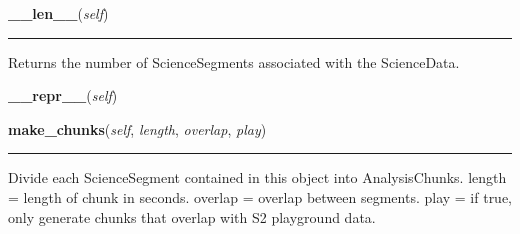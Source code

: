    \label{pipeline:ScienceData:__len__}
    \vspace{0.5ex}

    \noindent\begin{boxedminipage}{\textwidth}

    \raggedright \textbf{\_\_len\_\_}(\textit{self})

    \vspace{-1.5ex}

    \rule{\textwidth}{0.5\fboxrule}
    Returns the number of ScienceSegments associated with the 
    ScienceData.

    \vspace{1ex}

    \end{boxedminipage}

    \label{pipeline:ScienceData:__repr__}
    \vspace{0.5ex}

    \noindent\begin{boxedminipage}{\textwidth}

    \raggedright \textbf{\_\_repr\_\_}(\textit{self})

    \end{boxedminipage}

    \label{pipeline:ScienceData:make_chunks}
    \vspace{0.5ex}

    \noindent\begin{boxedminipage}{\textwidth}

    \raggedright \textbf{make\_chunks}(\textit{self}, \textit{length}, \textit{overlap}, \textit{play})

    \vspace{-1.5ex}

    \rule{\textwidth}{0.5\fboxrule}
    Divide each ScienceSegment contained in this object into 
    AnalysisChunks. length = length of chunk in seconds. overlap = 
    overlap between segments. play = if true, only generate chunks that 
    overlap with S2 playground data.

    \vspace{1ex}

    \end{boxedminipage}

